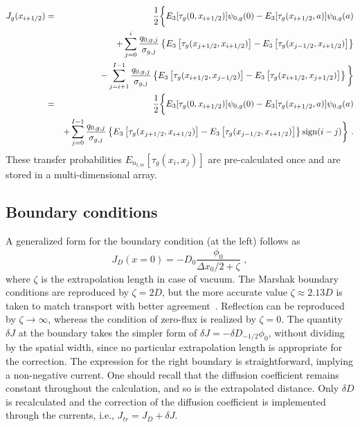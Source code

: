\begin{eqnarray}\label{eq:tot-J-disc2-l=0}
J_g(x_{i+1/2}) &=& \frac{1}{2}
\bigg\{
E_3[\tau_g(0,x_{i+1/2})] \psi_{0,g}(0) 
- E_3[\tau_g(x_{i+1/2},a)]\psi_{0,g}(a)  \nonumber \\
&&+
\sum\limits_{j=0}^i \frac{q_{0,g,j}}{\sigma_{g,j}} 
\left\{
E_3\left[
\tau_g(x_{j+1/2},x_{i+1/2}) \right] 
- E_3\left[
\tau_g(x_{j-1/2},x_{i+1/2})
\right] 
\right\}
\nonumber \\
&&-
\sum\limits_{j=i+1}^{I-1} \frac{q_{0,g,j}}{\sigma_{g,j}} 
\left\{
E_3\left[
\tau_g(x_{i+1/2},x_{j-1/2}) \right] 
- E_3\left[
\tau_g(x_{i+1/2},x_{j+1/2})
\right]
\right\}
\bigg\}	\nonumber \\
&=&\frac{1}{2}
\bigg\{
E_3[\tau_g(0,x_{i+1/2})] \psi_{0,g}(0) 
- E_3[\tau_g(x_{i+1/2},a)]\psi_{0,g}(a)  \nonumber \\
&&+
\sum\limits_{j=0}^{I-1} \frac{q_{0,g,j}}{\sigma_{g,j}} 
\left\{
E_3\left[
\tau_g(x_{j+1/2},x_{i+1/2}) \right] 
- E_3\left[
\tau_g(x_{j-1/2},x_{i+1/2})
\right] 
\right\}\text{sign}(i-j)
\bigg\}
\,\, . 
\end{eqnarray}
These transfer probabilities $E_{n_{l,m}}[\tau_g(x_i,x_j)]$ are pre-calculated once and are stored in a multi-dimensional array.

%
\subsection{Boundary conditions}
\label{sec:BC}
A generalized form for the boundary condition (at the left) follows as
\begin{equation}\label{eq:BC}
J_D(x=0) = -D_0\frac{\phi_0}{\Delta x_0/2 + \zeta} \,\, ,
\end{equation} 
where $\zeta$ is the extrapolation length in case of vacuum. The Marshak boundary conditions are reproduced by $\zeta=2D$, but the more accurate value $\zeta\approx 2.13D$ is
taken to match transport with better agreement~\cite{Lamarsh-1966}. Reflection can be reproduced by $\zeta\rightarrow\infty$, whereas the condition of zero-flux is realized by $\zeta=0$. 
%
The quantity $\delta J$ at the boundary takes the simpler form of $\delta J = -\delta D_{-1/2}\phi_0$, without dividing by the spatial width, since no particular extrapolation length is appropriate for the correction. The expression for the right boundary is straightforward, implying a non-negative current. One should recall that the diffusion coefficient remains constant throughout the calculation, and so is the extrapolated distance. Only $\delta D$ is recalculated and the correction of the diffusion coefficient is implemented through the currents, i.e., $J_{tr} = J_D + \delta J$.

